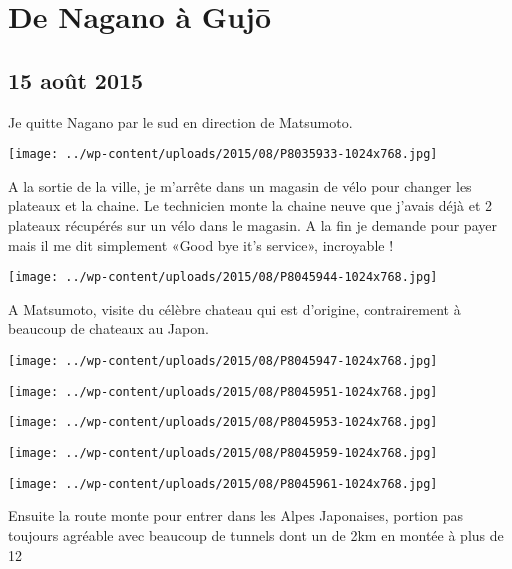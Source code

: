 \chapter{De Nagano à Gujō}
\section*{15 août 2015}
Je quitte Nagano par le sud en direction de Matsumoto. \newline
 \newline
\centerline{\texttt{[image: ../wp-content/uploads/2015/08/P8035933-1024x768.jpg]} } 
 \newline
 A la sortie de la ville, je m'arrête dans un magasin de vélo pour changer les plateaux et la chaine. Le technicien monte la chaine neuve que j'avais déjà et 2 plateaux récupérés sur un vélo dans le magasin. A la fin je demande pour payer mais il me dit simplement «Good bye it's service», incroyable ! \newline
 \newline
\centerline{\texttt{[image: ../wp-content/uploads/2015/08/P8045944-1024x768.jpg]} } 
 \newline
 A Matsumoto, visite du célèbre chateau qui est d'origine, contrairement à beaucoup de chateaux au Japon. \newline
 \newline
\centerline{\texttt{[image: ../wp-content/uploads/2015/08/P8045947-1024x768.jpg]} } 
 \newline
 \newline
\centerline{\texttt{[image: ../wp-content/uploads/2015/08/P8045951-1024x768.jpg]} } 
 \newline
 \newline
\centerline{\texttt{[image: ../wp-content/uploads/2015/08/P8045953-1024x768.jpg]} } 
 \newline
 \newline
\centerline{\texttt{[image: ../wp-content/uploads/2015/08/P8045959-1024x768.jpg]} } 
 \newline
 \newline
\centerline{\texttt{[image: ../wp-content/uploads/2015/08/P8045961-1024x768.jpg]} } 
 \newline
 Ensuite la route monte pour entrer dans les Alpes Japonaises, portion pas toujours agréable avec beaucoup de tunnels dont un de 2km en montée à plus de 12%
 \newline
